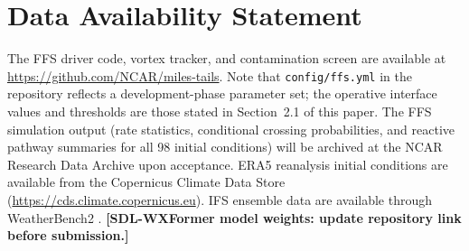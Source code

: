 \documentclass[11pt]{article}
\begin{document}
\section*{Data Availability Statement}
The FFS driver code, vortex tracker, and contamination screen are available at
\url{https://github.com/NCAR/miles-tails}.
Note that \texttt{config/ffs.yml} in the repository reflects a development-phase
parameter set; the operative interface values and thresholds are those stated in
Section~2.1 of this paper.
The FFS simulation output (rate statistics, conditional crossing probabilities, and
reactive pathway summaries for all 98 initial conditions) will be archived at the
NCAR Research Data Archive upon acceptance.
ERA5 reanalysis initial conditions are available from the Copernicus Climate Data Store
(\url{https://cds.climate.copernicus.eu}).
IFS ensemble data are available through WeatherBench2 \citep{rasp2024weatherbench2}.
\textbf{[SDL-WXFormer model weights: update repository link before submission.]}



\end{document}
